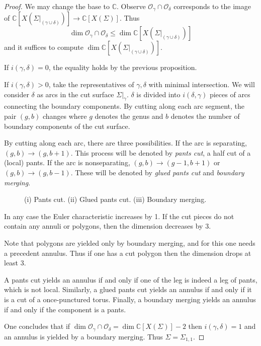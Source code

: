 \documentclass[10pt,a4paper]{amsart}
\newcommand{\C}{{\mathbb{C}}}
\newcommand{\Ocal}{{\mathcal{O}}}
\begin{document}
\begin{proof}
We may change the base to $\C$. Observe $\Ocal_\gamma \cap \Ocal_\delta$ corresponds to the image of $\C[X(\Sigma |_{(\gamma \cup \delta)})] \rightarrow \C[X(\Sigma)]$. Thus
\[
\dim \Ocal_\gamma \cap \Ocal_\delta \leq \dim \C[X(\Sigma |_{(\gamma \cup \delta)})]
\]
and it suffices to compute $\dim \C[X(\Sigma |_{(\gamma \cup \delta)})]$.

If $i(\gamma, \delta)=0$, the equality holds by the previous proposition.

If $i(\gamma, \delta)>0$, take the representatives of $\gamma, \delta$ with minimal intersection.
We will consider $\delta$ as arcs in the cut surface $\Sigma |_\gamma$. $\delta$ is divided into $i(\delta, \gamma)$ pieces of arcs connecting the boundary components. By cutting along each arc segment, the pair $(g, b)$ changes where $g$ denotes the genus and $b$ denotes the number of boundary components of the cut surface. 

By cutting along each arc, there are three possibilities. If the arc is separating, $(g, b) \rightarrow (g, b+1)$. This process will be denoted by \textit{pants cut}, a half cut of a (local) pants. If the arc is nonseparating, $(g, b) \rightarrow (g-1, b+1)$ or $(g, b) \rightarrow (g, b-1)$. These will be denoted by \textit{glued pants cut} and \textit{boundary merging}.

\begin{figure}[h]
    \centering
    
    
    
    \caption{(i) Pants cut. (ii) Glued pants cut. (iii) Boundary merging. }
\end{figure}

In any case the Euler characteristic increases by 1. If the cut pieces do not contain any annuli or polygons, then the dimension decreases by $3$. 

Note that polygons are yielded only by boundary merging, and for this one needs a precedent annulus. Thus if one has a cut polygon then the dimension drops at least $3$.

A pants cut yields an annulus if and only if one of the leg is indeed a leg of pants, which is not local. Similarly, a glued pants cut yields an annulus if and only if it is a cut of a once-punctured torus. Finally, a boundary merging yields an annulus if and only if the component is a pants.

One concludes that if $\dim \Ocal_\gamma \cap \Ocal_\delta = \dim \C[X(\Sigma)] - 2$ then $i(\gamma, \delta) = 1$ and an annulus is yielded by a boundary merging. Thus $\Sigma = \Sigma_{1, 1}$.
\end{proof}
\end{document}
